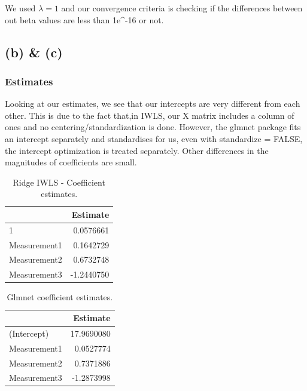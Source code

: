 \documentclass[12pt,halfline,a4paper,]{ouparticle}
\begin{document}
We used \(\lambda = 1\) and our convergence criteria is checking if the
differences between out beta values are less than 1e\^{}-16 or not.

\subsection{(b) \& (c)}\label{b-c}

\subsubsection{Estimates}\label{estimates}

Looking at our estimates, we see that our intercepts are very different
from each other. This is due to the fact that,in IWLS, our X matrix
includes a column of ones and no centering/standardization is done.
However, the glmnet package fits an intercept separately and
standardises for us, even with standardize = FALSE, the intercept
optimization is treated separately. Other differences in the magnitudes
of coefficients are small.\\

\begin{table}[!h]
\centering
\caption{\label{tab:unnamed-chunk-4}Ridge IWLS - Coefficient estimates.}
\centering
\begin{tabular}[t]{l|r}
\hline
  & Estimate\\
\hline
1 & 0.0576661\\
\hline
Measurement1 & 0.1642729\\
\hline
Measurement2 & 0.6732748\\
\hline
Measurement3 & -1.2440750\\
\hline
\end{tabular}
\end{table}

\begin{table}[!h]
\centering
\caption{\label{tab:unnamed-chunk-4}Glmnet coefficient estimates.}
\centering
\begin{tabular}[t]{l|r}
\hline
  & Estimate\\
\hline
(Intercept) & 17.9690080\\
\hline
Measurement1 & 0.0527774\\
\hline
Measurement2 & 0.7371886\\
\hline
Measurement3 & -1.2873998\\
\hline
\end{tabular}
\end{table}
\end{document}
